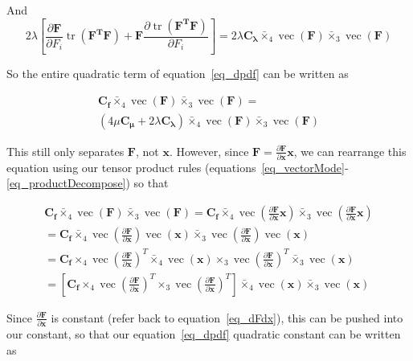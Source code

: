 \documentclass[twocolumn,10pt]{asme2ej}
\DeclareMathOperator{\vect}{vec}
\DeclareMathOperator{\tr}{tr}
\begin{document}
And
\begin{equation}
2\lambda \left[\frac{\partial \bm{F}}{\partial F_i}\tr \left(\bm{F^TF}\right) + \bm{F}\frac{\partial \tr \left(\bm{F^TF}\right)}{\partial F_i} \right] = 2\lambda \bm{C_{\lambda}} \bar{\times}_4 \vect (\bm{F}) \bar{\times}_3 \vect (\bm{F})
\end{equation}

So the entire quadratic term of equation~\ref{eq_dpdf} can be written as

\begin{multline}
\bm{C_f} \bar{\times}_4 \vect (\bm{F}) \bar{\times}_3 \vect (\bm{F}) =  \\ \left(4\mu \bm{C_{\mu}} + 2\lambda \bm{C_{\lambda}}\right) \bar{\times}_4 \vect (\bm{F}) \bar{\times}_3 \vect (\bm{F})
\end{multline}

This still only separates $\bm{F}$, not $\bm{x}$. However, since $\bm{F} = \frac{\partial \bm{F}}{\partial \bm{x}}\bm{x}$, we can rearrange this equation using our tensor product rules (equations~\ref{eq_vectorMode}-\ref{eq_productDecompose}) so that
\begin{center}
  \begin{multline}
  \bm{C_f} \bar{\times}_4 \vect (\bm{F}) \bar{\times}_3 \vect (\bm{F}) = \bm{C_f} \bar{\times}_4 \vect \left( \frac{\partial \bm{F}}{\partial \bm{x}}\bm{x}\right) \bar{\times}_3 \vect \left( \frac{\partial \bm{F}}{\partial \bm{x}}\bm{x}\right)
  \\ = \bm{C_f} \bar{\times}_4 \vect \left( \frac{\partial \bm{F}}{\partial \bm{x}}\right) \vect (\bm{x}) \bar{\times}_3 \vect \left( \frac{\partial \bm{F}}{\partial \bm{x}}\right) \vect (\bm{x})
  \\ = \bm{C_f} \times_4 \vect \left( \frac{\partial \bm{F}}{\partial \bm{x}}\right)^T \bar{\times}_4 \vect (\bm{x}) \times_3 \vect \left( \frac{\partial \bm{F}}{\partial \bm{x}}\right)^T \bar{\times}_3 \vect (\bm{x})
  \\ = \left[\bm{C_f} \times_4 \vect \left( \frac{\partial \bm{F}}{\partial \bm{x}}\right)^T \times_3 \vect \left( \frac{\partial \bm{F}}{\partial \bm{x}}\right)^T\right] \bar{\times}_4 \vect (\bm{x}) \bar{\times}_3 \vect (\bm{x})
\end{multline}
\end{center}

Since $\frac{\partial \bm{F}}{\partial \bm{x}}$ is constant (refer back to equation~\ref{eq_dFdx}), this can be pushed into our constant, so that our equation~\ref{eq_dpdf} quadratic constant can be written as
\end{document}
